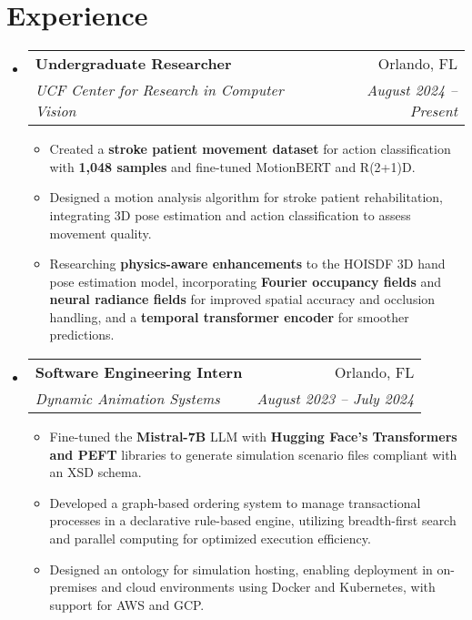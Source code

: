\documentclass[letterpaper,11pt]{article}
\makeatletter
\newcommand{\resumeItem}[1]{
  \item\small{
    {#1 \vspace{-2pt}}
  }
}
\newcommand{\resumeSubheading}[4]{
  \vspace{-2pt}\item
    \begin{tabular*}{0.97\textwidth}[t]{l@{\extracolsep{\fill}}r}
      \textbf{#1} & #2 \\
      \textit{\small#3} & \textit{\small #4} \\
    \end{tabular*}\vspace{-7pt}
}
\newcommand{\resumeSubHeadingListStart}{\begin{itemize}[leftmargin=0.15in, label={}]}
\newcommand{\resumeSubHeadingListEnd}{\end{itemize}}
\newcommand{\resumeItemListStart}{\begin{itemize}}
\newcommand{\resumeItemListEnd}{\end{itemize}\vspace{-5pt}}
\makeatother
\begin{document}
\section{Experience}
  \resumeSubHeadingListStart
    \resumeSubheading
      {Undergraduate Researcher}{Orlando, FL}
      {UCF Center for Research in Computer Vision}{August 2024 -- Present}
      \resumeItemListStart
        \resumeItem{Created a \textbf{stroke patient movement dataset} for action classification with \textbf{1,048 samples} and fine-tuned MotionBERT and R(2+1)D.}
        \resumeItem{Designed a motion analysis algorithm for stroke patient rehabilitation, integrating 3D pose estimation and action classification to assess movement quality.}
        \resumeItem{Researching \textbf{physics-aware enhancements} to the HOISDF 3D hand pose estimation model, incorporating \textbf{Fourier occupancy fields} and \textbf{neural radiance fields} for improved spatial accuracy and occlusion handling, and a \textbf{temporal transformer encoder} for smoother predictions.}
      \resumeItemListEnd
    \resumeSubheading
      {Software Engineering Intern}{Orlando, FL}
      {Dynamic Animation Systems}{August 2023 -- July 2024}
      \resumeItemListStart
        \resumeItem{Fine-tuned the \textbf{Mistral-7B} LLM with \textbf{Hugging Face's Transformers and PEFT} libraries to generate simulation scenario files compliant with an XSD schema.}
        \resumeItem{Developed a graph-based ordering system to manage transactional processes in a declarative rule-based engine, utilizing breadth-first search and parallel computing for optimized execution efficiency.}
        \resumeItem{Designed an ontology for simulation hosting, enabling deployment in on-premises and cloud environments using Docker and Kubernetes, with support for AWS and GCP.}
      \resumeItemListEnd
  \resumeSubHeadingListEnd
\end{document}
